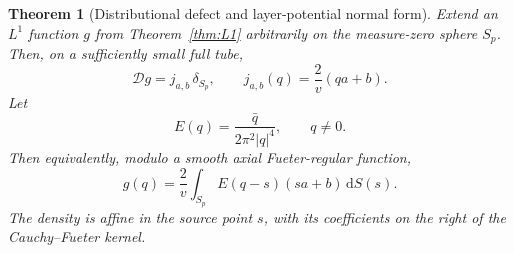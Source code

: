 \documentclass[11pt,a4paper]{article}
\numberwithin{equation}{section}
\newtheorem{theorem}{Theorem}[section]
\theoremstyle{definition}
\theoremstyle{remark}
\newcommand{\D}{\mathcal D}
\newcommand{\dd}{\,\mathrm d}
\begin{document}
\begin{theorem}[Distributional defect and layer-potential normal form]
\label{thm:defect}
Extend an $L^1$ function $g$ from Theorem~\ref{thm:L1} arbitrarily on the
measure-zero sphere $S_p$. Then, on a sufficiently small full tube,
\begin{equation}
 \D g=j_{a,b}\,\delta_{S_p},\qquad
 j_{a,b}(q)=\frac2v(qa+b).
 \label{eq:defect}
\end{equation}
Let
\[
 E(q)=\frac{\bar q}{2\pi^2|q|^4},\qquad q\ne0.
\]
Then equivalently, modulo a smooth axial Fueter-regular function,
\begin{equation}
 g(q)=\frac2v\int_{S_p}E(q-s)(sa+b)\dd S(s).
 \label{eq:layer}
\end{equation}
The density is affine in the source point $s$, with its coefficients on the
right of the Cauchy--Fueter kernel.
\end{theorem}
\end{document}
